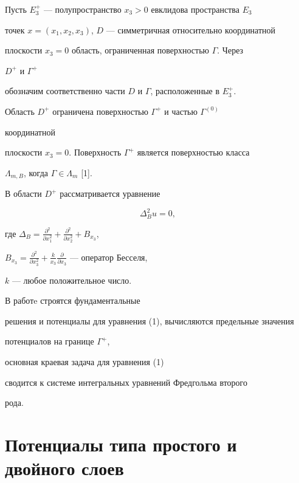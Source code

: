  


Пусть $E^+_3$ --- полупространство $x_3>0$ евклидова пространства $E_3$ 


точек $x=(x_1,x_2,x_3)$, $D$ --- симметричная относительно координатной 


плоскости $x_3=0$ область, ограниченная поверхностью $\Gamma$. Через 


$D^+$ и $\Gamma^+$ 


обозначим соответственно части $D$ и $\Gamma$, расположенные в $E^+_3$. 


Область $D^+$ ограничена поверхностью $\Gamma^+$ и частью $\Gamma^{(0)}$ 


координатной 


плоскости $x_3=0$. Поверхность $\Gamma^+$ является поверхностью класса 


$\Lambda_{m,B}$, когда $\Gamma\in\Lambda_m$ [1]. 


 


В области $D^+$ рассматривается уравнение 


\begin{equation} 


\Delta^2_B u=0, 


\end{equation} 


где $\Delta_B=\frac{\partial^2}{\partial 


x^2_1}+\frac{\partial^2}{\partial x^2_2}+B_{x_3}$, 


$B_{x_3}=\frac{\partial^2}{\partial 


x^2_3}+\frac{k}{x_3}\frac{\partial}{\partial x_3}$ --- оператор Бесселя, 


$k$ --- любое положительное число. 


 


В работe строятся фундаментальные 


решения и потенциалы для уравнения (1), вычисляются предельные значения 


потенциалов на границе $\Gamma^+$, 


основная краевая задача для уравнения (1) 


сводится к системе интегральных уравнений Фредгольма второго 


рода. 


 


\section{Потенциалы типа простого и двойного слоев} 



